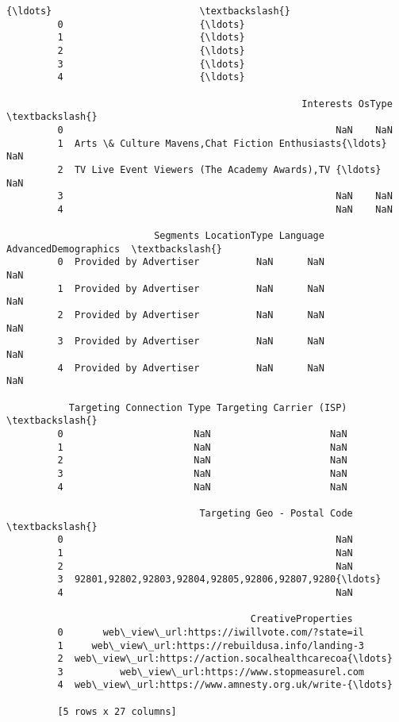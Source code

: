 \documentclass[11pt]{article}
\begin{document}
\begin{Verbatim}[commandchars=\\\{\}]
                                  {\ldots}                          \textbackslash{}
         0                        {\ldots}                           
         1                        {\ldots}                           
         2                        {\ldots}                           
         3                        {\ldots}                           
         4                        {\ldots}                           
         
                                                    Interests OsType  \textbackslash{}
         0                                                NaN    NaN   
         1  Arts \& Culture Mavens,Chat Fiction Enthusiasts{\ldots}    NaN   
         2  TV Live Event Viewers (The Academy Awards),TV {\ldots}    NaN   
         3                                                NaN    NaN   
         4                                                NaN    NaN   
         
                          Segments LocationType Language  AdvancedDemographics  \textbackslash{}
         0  Provided by Advertiser          NaN      NaN                   NaN   
         1  Provided by Advertiser          NaN      NaN                   NaN   
         2  Provided by Advertiser          NaN      NaN                   NaN   
         3  Provided by Advertiser          NaN      NaN                   NaN   
         4  Provided by Advertiser          NaN      NaN                   NaN   
         
           Targeting Connection Type Targeting Carrier (ISP)  \textbackslash{}
         0                       NaN                     NaN   
         1                       NaN                     NaN   
         2                       NaN                     NaN   
         3                       NaN                     NaN   
         4                       NaN                     NaN   
         
                                  Targeting Geo - Postal Code  \textbackslash{}
         0                                                NaN   
         1                                                NaN   
         2                                                NaN   
         3  92801,92802,92803,92804,92805,92806,92807,9280{\ldots}   
         4                                                NaN   
         
                                           CreativeProperties  
         0       web\_view\_url:https://iwillvote.com/?state=il  
         1     web\_view\_url:https://rebuildusa.info/landing-3  
         2  web\_view\_url:https://action.socalhealthcarecoa{\ldots}  
         3          web\_view\_url:https://www.stopmeasurel.com  
         4  web\_view\_url:https://www.amnesty.org.uk/write-{\ldots}  
         
         [5 rows x 27 columns]
\end{Verbatim}
            
\end{document}
